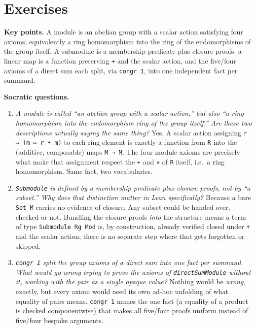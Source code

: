 \section{Exercises}\label{sec:10-modules:07-exercises:1}

\textbf{Key points.} A module is an abelian group with a scalar action satisfying four axioms, equivalently a ring homomorphism into the ring of the endomorphisms of the group itself. A submodule is a membership predicate plus closure proofs, a linear map is a function preserving \texttt{+} and the scalar action, and the five/four axioms of a direct sum each split, via \texttt{congr 1}, into one independent fact per summand.

\textbf{Socratic questions.}

\begin{enumerate}
\def\labelenumi{\arabic{enumi}.}
\item
  \emph{A module is called ``an abelian group with a scalar action,'' but also ``a ring homomorphism into the endomorphism ring of the group itself.'' Are these two descriptions actually saying the same thing?} Yes. A scalar action assigning \texttt{r ↦ (m ↦ r • m)} to each ring element is exactly a function from \texttt{R} into the (additive, composable) maps \texttt{M → M}. The four module axioms are precisely what make that assignment respect the \texttt{+} and \texttt{×} of \texttt{R} itself, i.e.~a ring homomorphism. Same fact, two vocabularies.
\item
  \emph{\texttt{Submodule} is defined by a membership predicate plus closure proofs, not by ``a subset.'' Why does that distinction matter in Lean specifically?} Because a bare \texttt{Set M} carries no evidence of closure. Any subset could be handed over, checked or not. Bundling the closure proofs \emph{into} the structure means a term of type \texttt{Submodule Rg Mod} is, by construction, already verified closed under \texttt{+} and the scalar action; there is no separate step where that gets forgotten or skipped.
\item
  \emph{\texttt{congr 1} split the group axioms of a direct sum into one fact per summand. What would go wrong trying to prove the axioms of \texttt{directSumModule} without it, working with the pair as a single opaque value?} Nothing would be \emph{wrong}, exactly, but every axiom would need its own ad-hoc unfolding of what equality of pairs means. \texttt{congr 1} names the one fact (a equality of a product is checked componentwise) that makes all five/four proofs uniform instead of five/four bespoke arguments.

\end{enumerate}
